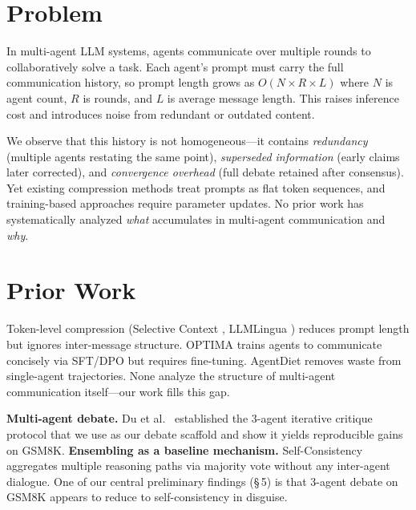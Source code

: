 
\section*{Problem}

In multi-agent LLM systems, agents communicate over multiple rounds to collaboratively solve a task. Each agent's prompt must carry the full communication history, so prompt length grows as $O(N \times R \times L)$ where $N$ is agent count, $R$ is rounds, and $L$ is average message length. This raises inference cost and introduces noise from redundant or outdated content.

We observe that this history is not homogeneous---it contains \textit{redundancy} (multiple agents restating the same point), \textit{superseded information} (early claims later corrected), and \textit{convergence overhead} (full debate retained after consensus). Yet existing compression methods \cite{li2023compressingcontextenhanceinference, pan2024llmlingua2datadistillationefficient} treat prompts as flat token sequences, and training-based approaches \cite{chen2025optimaoptimizingeffectivenessefficiency} require parameter updates. No prior work has systematically analyzed \textit{what} accumulates in multi-agent communication and \textit{why}.

\section*{Prior Work}

Token-level compression (Selective Context \cite{li2023compressingcontextenhanceinference}, LLMLingua \cite{pan2024llmlingua2datadistillationefficient}) reduces prompt length but ignores inter-message structure. OPTIMA \cite{chen2025optimaoptimizingeffectivenessefficiency} trains agents to communicate concisely via SFT/DPO but requires fine-tuning. AgentDiet \cite{xiao2026reducingcostllmagents} removes waste from single-agent trajectories. None analyze the structure of multi-agent communication itself---our work fills this gap.

\textbf{Multi-agent debate.} Du et al.\ \cite{du2023improvingfactualityreasoninglanguage} established the 3-agent iterative critique protocol that we use as our debate scaffold and show it yields reproducible gains on GSM8K. \textbf{Ensembling as a baseline mechanism.} Self-Consistency \cite{wang2023selfconsistencyimproveschainthought} aggregates multiple reasoning paths via majority vote without any inter-agent dialogue. One of our central preliminary findings (\S\,5) is that 3-agent debate on GSM8K appears to reduce to self-consistency in disguise.

